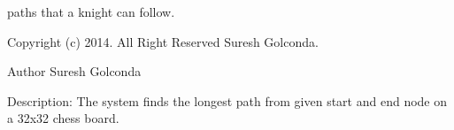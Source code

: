 paths that a knight can follow.

\-Copyright (c) 2014. \-All \-Right \-Reserved \-Suresh \-Golconda. \begin{DoxyAuthor}{\-Author}
\-Suresh \-Golconda
\end{DoxyAuthor}
\begin{DoxyParagraph}{\-Description\-: \-The system finds the longest path from given}
start and end node on a 32x32 chess board. 
\end{DoxyParagraph}
